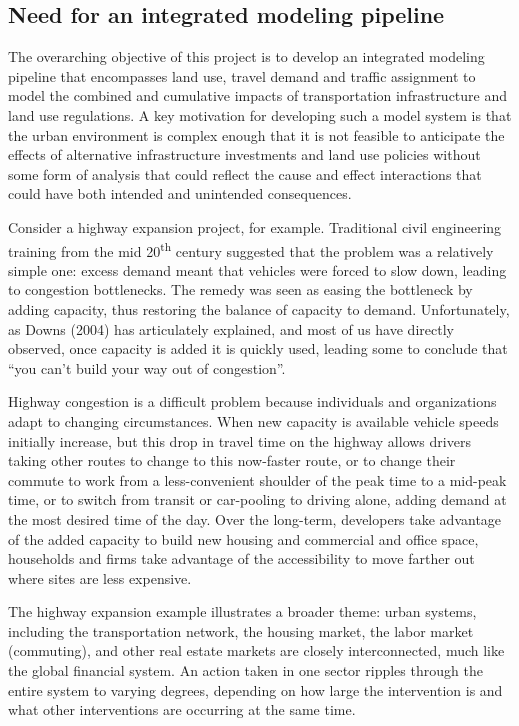 \subsection{Need for an integrated modeling pipeline}

The overarching objective of this project is to develop an integrated modeling pipeline that encompasses land use, travel demand and traffic assignment to model the combined and cumulative impacts of transportation infrastructure and land use regulations. A key motivation for developing such a model system is that the urban environment
is complex enough that it is not feasible to anticipate the effects of alternative infrastructure investments and land use policies without some form of analysis that could reflect the cause and effect interactions that could have both intended and unintended consequences.

Consider a highway expansion project, for example. Traditional civil engineering training from the mid 20\textsuperscript{th} century suggested that the problem was a relatively simple one: excess demand meant that vehicles were forced to slow down, leading to congestion bottlenecks. The remedy was seen as easing the bottleneck by adding capacity, thus restoring the balance of capacity to demand. Unfortunately, as Downs (2004) has articulately explained, and most of us have directly observed, once capacity is added it is quickly used, leading some to conclude that \enquote{you can't build your way out of congestion}.

Highway congestion is a difficult problem because individuals and organizations adapt to changing circumstances. When new capacity is available vehicle speeds initially increase, but this drop in travel time on the highway allows drivers taking other routes to change to this now-faster route, or to change their commute to work from a less-convenient shoulder of the peak time to a mid-peak time, or to switch from transit or car-pooling to driving alone, adding demand at the most desired time of the day. Over the long-term, developers take advantage of the added capacity to build new housing and commercial and office space, households and firms take advantage of the accessibility to move farther out where sites are less expensive.

The highway expansion example illustrates a broader theme: urban systems, including the transportation network, the housing market, the labor market (commuting), and other real estate markets are closely interconnected, much like the global financial system. An action taken in one sector ripples through the entire system to varying degrees, depending on how large the intervention is and what other interventions are occurring at the same time.

